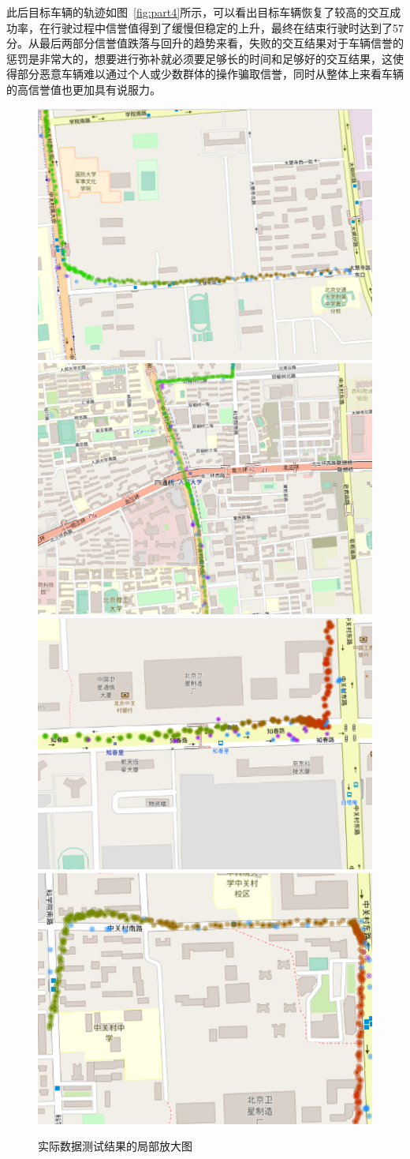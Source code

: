 此后目标车辆的轨迹如图~\ref{fig:part4}所示，可以看出目标车辆恢复了较高的交互成功率，在行驶过程中信誉值得到了缓慢但稳定的上升，最终在结束行驶时达到了57分。从最后两部分信誉值跌落与回升的趋势来看，失败的交互结果对于车辆信誉的惩罚是非常大的，想要进行弥补就必须要足够长的时间和足够好的交互结果，这使得部分恶意车辆难以通过个人或少数群体的操作骗取信誉，同时从整体上来看车辆的高信誉值也更加具有说服力。

\begin{figure}
  \centering
  \subcaptionbox{\label{fig:part1}}
    {\includegraphics[width=0.49\linewidth]{figures/partial1.png}}
  \subcaptionbox{\label{fig:part2}}
    {\includegraphics[width=0.49\linewidth]{figures/partial2.png}}
    \subcaptionbox{\label{fig:part3}}
    {\includegraphics[width=0.49\linewidth]{figures/partial3.png}}
    \subcaptionbox{\label{fig:part4}}
    {\includegraphics[width=0.49\linewidth]{figures/partial4.png}}
  \caption{实际数据测试结果的局部放大图}
  \label{fig:partials}
\end{figure}

